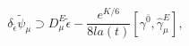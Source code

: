 \begin{equation} \label{basiceq}
\delta_{\tilde  \epsilon}\tilde  \psi_\mu\supset  D^E_\mu  \tilde  \epsilon-
\frac{e^{K/6}}{8la(t)}\left [ \gamma^{\bar 0}, \hat \gamma^E_\mu\right ],
\end{equation}

